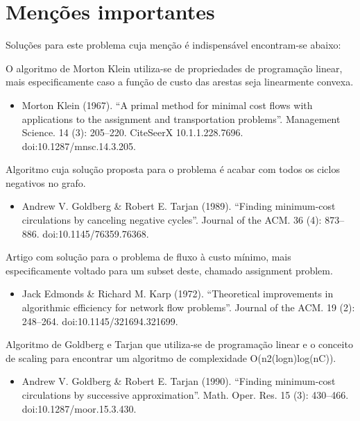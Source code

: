 \documentclass[12pt, a4]{article}
\begin{document}
\section{Menções importantes}
\label{sec:important-mentions}

Soluções para este problema cuja menção é indispensável encontram-se abaixo:

O algoritmo de Morton Klein utiliza-se de propriedades de programação linear,
mais especificamente caso a função de custo das arestas seja linearmente
convexa.

\begin{itemize}
\item Morton Klein (1967). ``A primal method for minimal cost flows with
  applications to the assignment and transportation problems''. Management
  Science. 14 (3): 205–220. CiteSeerX 10.1.1.228.7696.
  doi:10.1287/mnsc.14.3.205.
\end{itemize}

Algoritmo cuja solução proposta para o problema é acabar com todos os ciclos
negativos no grafo.

\begin{itemize}
\item Andrew V. Goldberg \& Robert E. Tarjan (1989). ``Finding minimum-cost
  circulations by canceling negative cycles''. Journal of the ACM. 36 (4):
  873–886. doi:10.1145/76359.76368.
\end{itemize}

Artigo com solução para o problema de fluxo à custo mínimo, mais especificamente
voltado para um subset deste, chamado assignment problem.

\begin{itemize}
\item Jack Edmonds \& Richard M. Karp (1972). ``Theoretical improvements in
  algorithmic efficiency for network flow problems''. Journal of the ACM. 19
  (2): 248–264. doi:10.1145/321694.321699.
\end{itemize}

Algoritmo de Goldberg e Tarjan que utiliza-se de programação linear e o conceito
de scaling para encontrar um algoritmo de complexidade O(n2(logn)log(nC)).

\begin{itemize}
\item Andrew V. Goldberg \& Robert E. Tarjan (1990). ``Finding minimum-cost
  circulations by successive approximation''. Math. Oper. Res. 15 (3): 430–466.
  doi:10.1287/moor.15.3.430.
\end{itemize}
\end{document}
